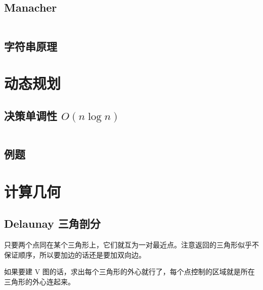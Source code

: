 \documentclass[a4paper, twoside]{article}
\begin{document}
\begin{multicols}{2}


			\subsection[Manacher 马拉车]{Manacher}
				\inputminted{cpp}{../src/string/manacher.cpp}
			


			\subsection{字符串原理}
				

		\newpage
		\section{动态规划}
			\subsection{决策单调性 $O(n\log n)$}
				\inputminted{cpp}{../src/dp/决策单调性.cpp}
			
			\subsection{例题}
				

		\newpage
		\section{计算几何}
		 	\subsection{Delaunay 三角剖分}
				只要两个点同在某个三角形上，它们就互为一对最近点。注意返回的三角形似乎不保证顺序，所以要加边的话还是要加双向边。
				
				如果要建 V 图的话，求出每个三角形的外心就行了，每个点控制的区域就是所在三角形的外心连起来。
				\inputminted{cpp}{../src/geometry/delaunay.cpp}
		
	\end{multicols}
			
\end{document}

